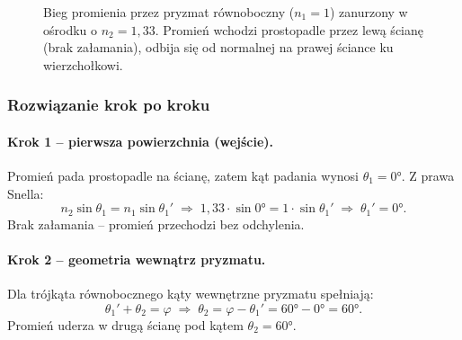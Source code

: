 \documentclass[12pt,a4paper]{article}
\begin{document}
\begin{figure}[H]
\caption{Bieg promienia przez pryzmat równoboczny ($n_1=1$) zanurzony
         w ośrodku o $n_2=1{,}33$.
         Promień wchodzi prostopadle przez lewą ścianę (brak załamania),
         odbija się od normalnej na prawej ściance ku wierzchołkowi.}
\end{figure}

\subsubsection*{Rozwiązanie krok po kroku}

\paragraph{Krok 1 – pierwsza powierzchnia (wejście).}
Promień pada prostopadle na ścianę, zatem kąt padania wynosi $\theta_1 = 0°$.
Z prawa Snella:
\[
  n_2 \sin\theta_1 = n_1 \sin\theta_1'
  \;\Longrightarrow\;
  1{,}33 \cdot \sin 0° = 1 \cdot \sin\theta_1'
  \;\Longrightarrow\;
  \theta_1' = 0°.
\]
Brak załamania -- promień przechodzi bez odchylenia.

\paragraph{Krok 2 – geometria wewnątrz pryzmatu.}
Dla trójkąta równobocznego kąty wewnętrzne pryzmatu spełniają:
\[
  \theta_1' + \theta_2 = \varphi
  \;\Longrightarrow\;
  \theta_2 = \varphi - \theta_1' = 60° - 0° = 60°.
\]
Promień uderza w drugą ścianę pod kątem $\theta_2 = 60°$.
\end{document}
